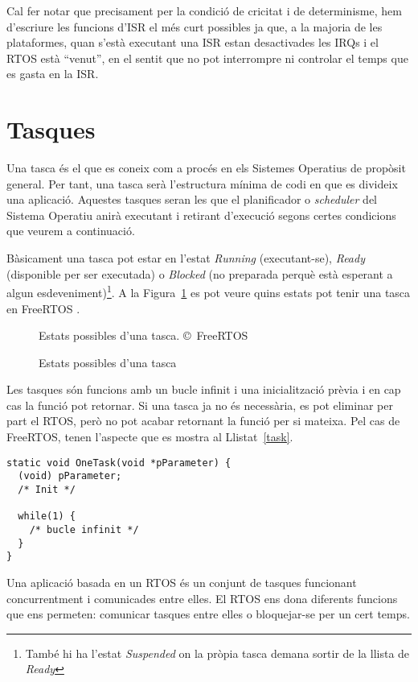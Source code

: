 Cal fer notar que precisament per la condició de cricitat i de determinisme, hem d'escriure les funcions d'\gls{ISR} el més curt possibles ja que, a la majoria de les plataformes, quan s'està executant una ISR estan desactivades les \glspl{IRQ} i el RTOS està ``venut'', en el sentit que no pot interrompre ni controlar el temps que es gasta en la ISR.

\section{Tasques}

Una tasca és el que es coneix com a procés en els Sistemes Operatius de propòsit general. Per tant, una tasca serà l'estructura mínima de codi en que es divideix una aplicació. Aquestes tasques seran les que el planificador o {\em scheduler} del Sistema Operatiu anirà executant i retirant d'execució segons certes condicions que veurem a continuació.

Bàsicament una tasca pot estar en l'estat {\em Running} (executant-se), {\em Ready} (disponible per ser executada) o {\em Blocked} (no preparada perquè està esperant a algun esdeveniment)\footnote{També hi ha l'estat {\em Suspended} on la pròpia tasca demana sortir de la llista de {\em Ready}}. A la Figura~\ref{fig:taskstate} es pot veure quins estats pot tenir una tasca en FreeRTOS \cite[92]{FreeRTOSBook}.


\begin{figure}
 \centering
 \caption{Estats possibles d'una tasca}{Estats possibles d'una tasca. \copyright\ FreeRTOS}
 \label{fig:taskstate}
\end{figure}

Les tasques són funcions amb un bucle infinit i una inicialització prèvia i en cap cas la funció pot retornar. Si una tasca ja no és necessària, es pot eliminar per part el RTOS, però no pot acabar retornant la funció per si mateixa.
Pel cas de \gls{FreeRTOS}, tenen l'aspecte que es mostra al Llistat~\ref{task}.

\begin{lstlisting}[caption={Esquelet d'una tasca},style=customc,label=task]
static void OneTask(void *pParameter) {
  (void) pParameter;
  /* Init */

  while(1) {
    /* bucle infinit */
  }
}
\end{lstlisting}

Una aplicació basada en un RTOS és un conjunt de tasques funcionant concurrentment i comunicades entre elles. El \gls{RTOS} ens dona diferents funcions que ens permeten: comunicar tasques entre elles o bloquejar-se per un cert temps.

